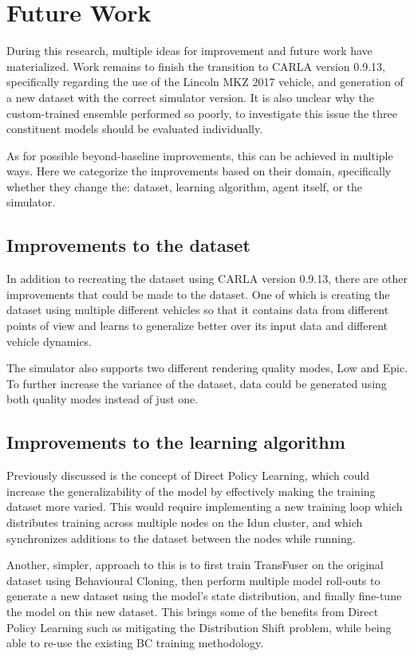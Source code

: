 
\section{Future Work}

During this research,
multiple ideas for improvement and future work have materialized.
Work remains to finish the transition to CARLA version 0.9.13,
specifically regarding the use of the Lincoln MKZ 2017 vehicle,
and generation of a new dataset with the correct simulator version.
It is also unclear why the custom-trained ensemble performed so poorly,
to investigate this issue the three constituent models should be evaluated individually.

As for possible beyond-baseline improvements,
this can be achieved in multiple ways.
Here we categorize the improvements based on their domain,
specifically whether they change the:
dataset,
learning algorithm,
agent itself,
or the simulator.

\subsection{Improvements to the dataset}

In addition to recreating the dataset using CARLA version 0.9.13,
there are other improvements that could be made to the dataset.
One of which is creating the dataset using multiple different vehicles
so that it contains data from different points of view
and learns to generalize better over its input data and different vehicle dynamics.

The simulator also supports two different rendering quality modes, Low and Epic.
To further increase the variance of the dataset,
data could be generated using both quality modes instead of just one.


\subsection{Improvements to the learning algorithm}

Previously discussed is the concept of Direct Policy Learning,
which could increase the generalizability of the model
by effectively making the training dataset more varied.
This would require implementing a new training loop which distributes
training across multiple nodes on the Idun cluster,
and which synchronizes additions to the dataset between the nodes while running.

Another, simpler, approach to this is to first train TransFuser on the original dataset using Behavioural Cloning,
then perform multiple model roll-outs to generate a new dataset using the model's state distribution,
and finally fine-tune the model on this new dataset.
This brings some of the benefits from Direct Policy Learning such as mitigating the Distribution Shift problem,
while being able to re-use the existing BC training methodology.


